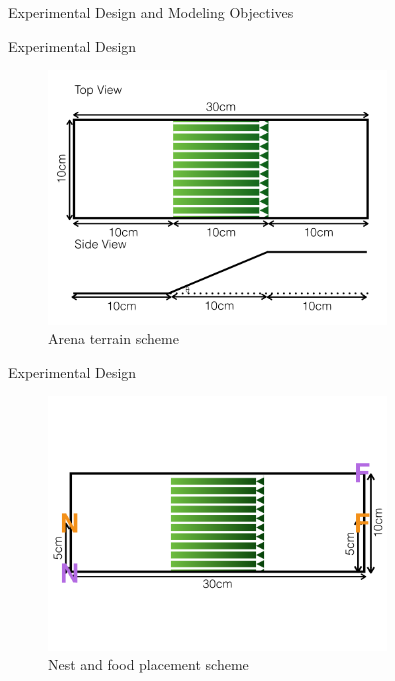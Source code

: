 \begin{subsection}{Experimental Design and Modeling Objectives}

\begin{frame}{Experimental Design}

\begin{figure}
    	\includegraphics[width=0.8\textwidth]{images/model_components_cartoons_011}
      \caption{Arena terrain scheme}
 \end{figure}
\end{frame}

\begin{frame}{Experimental Design}

   \begin{figure}
    	\includegraphics[width=0.8\textwidth]{images/model_components_cartoons_010}
				\vspace{-8ex}
				\caption{Nest and food placement scheme}
    \end{figure}
\end{frame}


\end{subsection}

